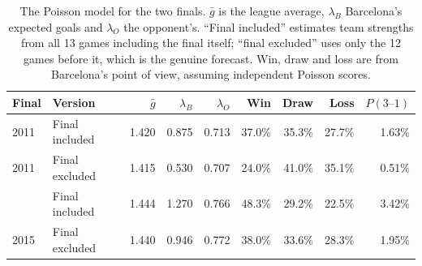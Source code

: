 \begin{table}[t]
\centering\small
\caption{The Poisson model for the two finals. $\bar g$ is the league average, $\lambda_B$ Barcelona's expected goals and $\lambda_O$ the opponent's. ``Final included'' estimates team strengths from all 13 games including the final itself; ``final excluded'' uses only the 12 games before it, which is the genuine forecast. Win, draw and loss are from Barcelona's point of view, assuming independent Poisson scores.}
\label{tab:poisson-finals}
\begin{tabular}{llrrrrrrr}
\toprule
Final & Version & $\bar g$ & $\lambda_B$ & $\lambda_O$ & Win & Draw & Loss & $P(3\text{--}1)$ \\
\midrule
2011 & Final included & 1.420 & 0.875 & 0.713 & 37.0\% & 35.3\% & 27.7\% & 1.63\% \\
2011 & Final excluded & 1.415 & 0.530 & 0.707 & 24.0\% & 41.0\% & 35.1\% & 0.51\% \\
\addlinespace
2015 & Final included & 1.444 & 1.270 & 0.766 & 48.3\% & 29.2\% & 22.5\% & 3.42\% \\
2015 & Final excluded & 1.440 & 0.946 & 0.772 & 38.0\% & 33.6\% & 28.3\% & 1.95\% \\
\bottomrule
\end{tabular}
\end{table}
